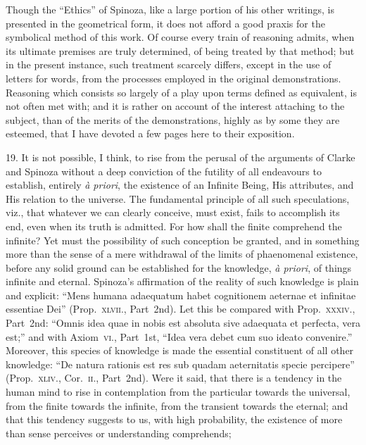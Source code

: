 \documentclass[oneside]{book}
\begin{document}
Though the ``Ethics'' of Spinoza, like a large portion of his
other writings, is presented in the geometrical form, it does not
afford a good praxis for the symbolical method of this work.
Of course every train of reasoning admits, when its ultimate
premises are truly determined, of being treated by that method;
but in the present instance, such treatment scarcely differs, except
in the use of letters for words, from the processes employed
in the original demonstrations. Reasoning which consists so
largely of a play upon terms defined as equivalent, is not often
met with; and it is rather on account of the interest attaching to
the subject, than of the merits of the demonstrations, highly as
by some they are esteemed, that I have devoted a few pages
here to their exposition.

19. It is not possible, I think, to rise from the perusal of the
arguments of Clarke and Spinoza without a deep conviction of the
futility of all endeavours to establish, entirely \textit{\`{a} priori}, the existence
of an Infinite Being, His attributes, and His relation to the universe.
The fundamental principle of all such speculations, viz., that
whatever we can clearly conceive, must exist, fails to accomplish
its end, even when its truth is admitted. For how shall the finite
comprehend the infinite? Yet must the possibility of such conception
be granted, and in something more than the sense of
a mere withdrawal of the limits of phaenomenal existence, before
any solid ground can be established for the knowledge, \textit{\`{a} priori},
of things infinite and eternal. Spinoza's affirmation of the reality
of such knowledge is plain and explicit: ``Mens humana
adaequatum habet cognitionem aeternae et infinitae essentiae Dei''
(Prop.~\textsc{xlvii}., Part~2nd). Let this be compared with Prop.~\textsc{xxxiv}.,
Part~2nd: ``Omnis idea quae in nobis est absoluta
sive adaequata et perfecta, vera est;'' and with Axiom~\textsc{vi}., Part~1st,
``Idea vera debet cum suo ideato convenire.'' Moreover, this
species of knowledge is made the essential constituent of all other
knowledge: ``De natura rationis est res sub quadam aeternitatis
specie percipere'' (Prop.~\textsc{xliv}., Cor.~\textsc{ii}., Part~2nd). Were it
said, that there is a tendency in the human mind to rise in contemplation
from the particular towards the universal, from the
finite towards the infinite, from the transient towards the eternal;
and that this tendency suggests to us, with high probability, the
existence of more than sense perceives or understanding comprehends;
\end{document}
